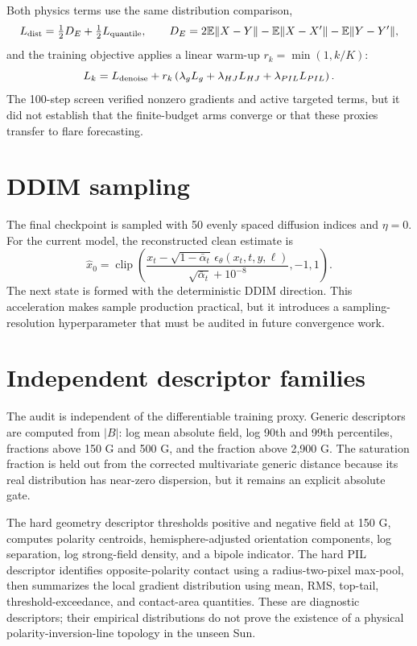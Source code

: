 \documentclass[11pt,oneside]{report}
\begin{document}
Both physics terms use the same distribution comparison,
\begin{equation}
  L_{\rm dist}=\tfrac12D_E+\tfrac12L_{\rm quantile}, \qquad
  D_E=2\mathbb{E}\|X-Y\|-\mathbb{E}\|X-X'\|-\mathbb{E}\|Y-Y'\|,
\end{equation}
and the training objective applies a linear warm-up $r_k=\min(1,k/K)$:
\begin{equation}
  L_k=L_{\rm denoise}+r_k\left(\lambda_gL_g+\lambda_{HJ}L_{HJ}+\lambda_{PIL}L_{PIL}\right).
\end{equation}
The 100-step screen verified nonzero gradients and active targeted terms, but it did not establish that the finite-budget arms converge or that these proxies transfer to flare forecasting.

\section{DDIM sampling}

The final checkpoint is sampled with 50 evenly spaced diffusion indices and $\eta=0$. For the current model, the reconstructed clean estimate is
\begin{equation}
  \widehat{x}_0 = \operatorname{clip}\left(\frac{x_t-\sqrt{1-\bar\alpha_t}\,\epsilon_\theta(x_t,t,y,\ell)}{\sqrt{\bar\alpha_t}+10^{-8}},-1,1\right).
\end{equation}
The next state is formed with the deterministic DDIM direction. This acceleration makes sample production practical, but it introduces a sampling-resolution hyperparameter that must be audited in future convergence work.

\section{Independent descriptor families}

The audit is independent of the differentiable training proxy. Generic descriptors are computed from $|B|$: log mean absolute field, log 90th and 99th percentiles, fractions above 150 G and 500 G, and the fraction above 2,900 G. The saturation fraction is held out from the corrected multivariate generic distance because its real distribution has near-zero dispersion, but it remains an explicit absolute gate.

The hard geometry descriptor thresholds positive and negative field at 150 G, computes polarity centroids, hemisphere-adjusted orientation components, log separation, log strong-field density, and a bipole indicator. The hard PIL descriptor identifies opposite-polarity contact using a radius-two-pixel max-pool, then summarizes the local gradient distribution using mean, RMS, top-tail, threshold-exceedance, and contact-area quantities. These are diagnostic descriptors; their empirical distributions do not prove the existence of a physical polarity-inversion-line topology in the unseen Sun.
\end{document}
